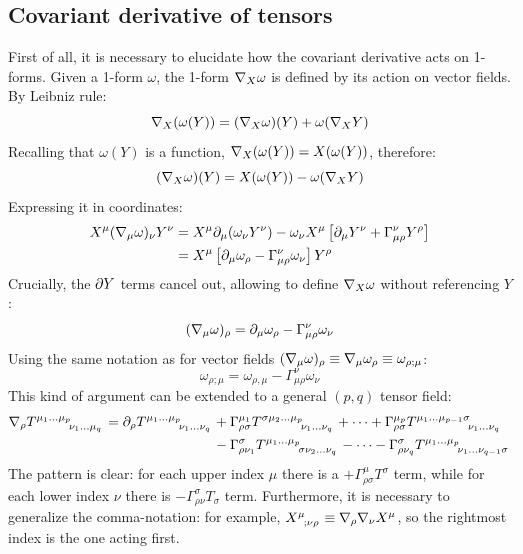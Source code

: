 \subsection{Covariant derivative of tensors}

First of all, it is necessary to elucidate how the covariant derivative acts on 1-forms. Given a 1-form $ \omega $, the 1-form $ \nabla_X \omega $ is defined by its action on vector fields. By Leibniz rule:
\begin{equation*}
  \nabla_X (\omega(Y)) = (\nabla_X \omega)(Y) + \omega(\nabla_X Y)
\end{equation*}
Recalling that $ \omega(Y) $ is a function, $ \nabla_X (\omega(Y)) = X(\omega(Y)) $, therefore:
\begin{equation}
  (\nabla_X \omega)(Y) = X(\omega(Y)) - \omega(\nabla_X Y)
\end{equation}
Expressing it in coordinates:
\begin{equation*}
  \begin{split}
    X^\mu (\nabla_\mu \omega)_\nu Y^\nu
    &= X^\mu \partial_\mu (\omega_\nu Y^\nu) - \omega_\nu X^\mu \left[ \partial_\mu Y^\nu + \Gamma^\nu_{\mu \rho} Y^\rho \right] \\
    &= X^\mu \left[ \partial_\mu \omega_\rho - \Gamma^\nu_{\mu \rho} \omega_{\nu} \right] Y^\rho
  \end{split}
\end{equation*}
Crucially, the $ \partial Y $ terms cancel out, allowing to define $ \nabla_X \omega $ without referencing $ Y $:
\begin{equation}
  (\nabla_\mu \omega)_\rho = \partial_\mu \omega_\rho - \Gamma^\nu_{\mu \rho} \omega_\nu
\end{equation}
Using the same notation as for vector fields $ (\nabla_\mu \omega)_\rho \equiv \nabla_\mu \omega_\rho \equiv \omega_{\rho ; \mu} $:
\begin{equation}
  \omega_{\rho ;\mu} = \omega_{\rho,\mu} - \Gamma^\nu_{\mu \rho} \omega_\nu
\end{equation}
This kind of argument can be extended to a general $ (p,q) $ tensor field:
\begin{equation}
  \begin{split}
    \na_\rho \tensor{T}{^{\mu_1} ^\dots ^{\mu_p} _{\nu_1} _\dots _{\mu_q}} = \pa_\rho \tensor{T}{^{\mu_1} ^\dots ^{\mu_p} _{\nu_1} _\dots _{\nu_q}}
    &+ \Gamma^{\mu_1}_{\rho \sigma} \tensor{T}{^\sigma ^{\mu_2} ^\dots ^{\mu_p} _{\nu_1} _\dots _{\nu_q}} + \dots + \Gamma^{\mu_p}_{\rho \sigma} \tensor{T}{^{\mu_1} ^\dots ^{\mu_{p-1}} ^\sigma _{\nu_1} _\dots _{\nu_q}} \\
    &- \Gamma^\sigma_{\rho \nu_1} \tensor{T}{^{\mu_1} ^\dots ^{\mu_p} _\sigma _{\nu_2} _\dots _{\nu_q}} - \dots - \Gamma^\sigma_{\rho \nu_q} \tensor{T}{^{\mu_1} ^\dots ^{\mu_p} _{\nu_1} _\dots _{\nu_{q-1}} _\sigma}
  \end{split}
\end{equation}
The pattern is clear: for each upper index $ \mu $ there is a $ + \Gamma^\mu_{\rho \sigma} T^\sigma $ term, while for each lower index $ \nu $ there is $ - \Gamma^\sigma_{\rho \nu} T_\sigma $ term. Furthermore, it is necessary to generalize the comma-notation: for example, $ \tensor{X}{^\mu _; _\nu _\rho} \equiv \na_\rho \na_\nu X^\mu $, so the rightmost index is the one acting first.

